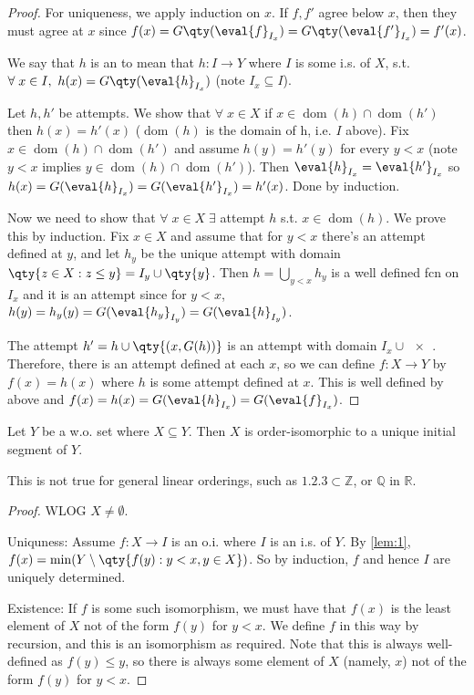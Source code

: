 \begin{proof}
    For uniqueness, we apply induction on $x$.
    If $f, f'$ agree below $x$, then they must agree at $x$ since $f(x) = G\qty(\eval{f}_{I_x}) = G\qty(\eval{f'}_{I_x}) = f'(x)$.

    We say that $h$ is an  to mean that $h \colon I \to Y$ where $I$ is some i.s. of $X$, s.t. $\forall \; x \in I,\ h(x) = G\qty(\eval{h}_{I_x})$ (note $I_x \subseteq I$).

    Let $h, h'$ be attempts.
    We show that $\forall \; x \in X$ if $x \in \operatorname{dom}(h) \cap \operatorname{dom}(h')$ then $h(x) = h'(x)$ ($\operatorname{dom}(h)$ is the domain of h, i.e. $I$ above).
    Fix $x \in \operatorname{dom}(h) \cap \operatorname{dom}(h')$ and assume $h(y) = h'(y)$ for every $y < x$ (note $y < x$ implies $y \in \operatorname{dom}(h) \cap \operatorname{dom}(h')$).
    Then $\eval{h}_{I_x} = \eval{h'}_{I_x}$ so $h(x) = G(\eval{h}_{I_x}) = G(\eval{h'}_{I_x}) = h'(x)$.
    Done by induction.

    Now we need to show that $\forall \; x \in X \; \exists$ attempt $h$ s.t. $x \in \operatorname{dom}(h)$.
    We prove this by induction.
    Fix $x \in X$ and assume that for $y < x$ there's an attempt defined at $y$, and let $h_y$ be the unique attempt with domain $\qty{z \in X : z \leq y} = I_y \cup \qty{y}$.
    Then $h = \bigcup_{y < x} h_y$ is a well defined fcn on $I_x$ and it is an attempt since for $y < x$, $h(y) = h_y(y) = G(\eval{h_y}_{I_y}) = G(\eval{h}_{I_y})$.

    The attempt $h' = h \cup \qty{(x, G(h))}$ is an attempt with domain $I_x \cup \qty{x}$.
    Therefore, there is an attempt defined at each $x$, so we can define $f \colon X \to Y$ by $f(x) = h(x)$ where $h$ is some attempt defined at $x$.
    This is well defined by above and $f(x) = h(x) = G(\eval{h}_{I_x}) = G(\eval{f}_{I_x})$.
\end{proof}

\begin{proposition} \label{prp:sbs}
    Let $Y$ be a w.o. set where $X \subseteq Y$.
    Then $X$ is order-isomorphic to a unique initial segment of $Y$.
\end{proposition}
This is not true for general linear orderings, such as $\qty{1, 2, 3} \subset \mathbb Z$, or $\mathbb Q$ in $\mathbb R$.
\begin{proof}
    WLOG $X \neq \emptyset$.

    Uniquness: Assume $f : X \to I$ is an o.i. where $I$ is an i.s. of $Y$.
    By \cref{lem:1}, $f(x) = \min(Y \setminus \qty{f(y) : y < x, y \in X})$.
    So by induction, $f$ and hence $I$ are uniquely determined.

    Existence:
    If $f$ is some such isomorphism, we must have that $f(x)$ is the least element of $X$ not of the form $f(y)$ for $y < x$.
    We define $f$ in this way by recursion, and this is an isomorphism as required.
    Note that this is always well-defined as $f(y) \leq y$, so there is always some element of $X$ (namely, $x$) not of the form $f(y)$ for $y < x$.
\end{proof}

